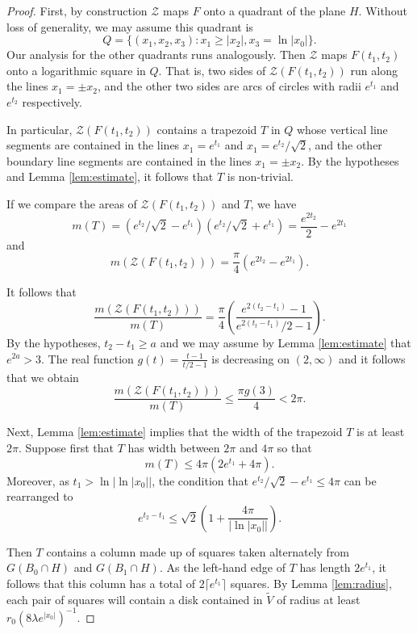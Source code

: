 \documentclass[11pt]{amsart}
\numberwithin{equation}{section}
\theoremstyle{definition}
\theoremstyle{definition}
\theoremstyle{definition}
\begin{document}
\begin{proof}
First, by construction $\mathcal{Z}$ maps $F$ onto a quadrant of the plane $H$. Without loss of generality, we may assume this quadrant is
\[ Q = \{ (x_1,x_2,x_3) : x_1 \geq |x_2|, x_3 = \ln |x_0| \}.\]
Our analysis for the other quadrants runs analogously. Then $\mathcal{Z}$ maps $F(t_1,t_2)$ onto a logarithmic square in $Q$. That is, two sides of $\mathcal{Z} ( F(t_1,t_2))$ run along the lines $x_1 = \pm x_2$, and the other two sides are arcs of circles with radii $e^{t_1}$ and $e^{t_2}$ respectively.

In particular, $\mathcal{Z} ( F(t_1,t_2))$ contains a trapezoid $T$ in $Q$ whose vertical line segments are contained in the lines $x_1 = e^{t_1}$ and $x_1 = e^{t_2}/\sqrt{2}$, and the other boundary line segments are contained in the lines $x_1 = \pm x_2$. By the hypotheses and Lemma \ref{lem:estimate}, it follows that $T$ is non-trivial. 

If we compare the areas of $\mathcal{Z} ( F(t_1,t_2))$ and $T$, we have
\[ m(T) = (e^{t_2}/\sqrt{2} - e^{t_1})(e^{t_2}/\sqrt{2} + e^{t_1}) = \frac{e^{2t_2}}{2} - e^{2t_1} \]
and
\[ m(\mathcal{Z} ( F(t_1,t_2))) = \frac{\pi}{4} (  e^{2t_2} - e^{2t_1}) .\]

It follows that
\[ \frac{  m(\mathcal{Z}( F(t_1,t_2) ) )}{m(T)} = \frac{\pi}{4} \left ( \frac{e^{2(t_2-t_1)} -1}{e^{2(t_t-t_1)}/2 -1} \right ). \]
By the hypotheses, $t_2-t_1\geq a$ and we may assume by Lemma \ref{lem:estimate} that $e^{2a}>3$. The real function $g(t) = \frac{t-1}{t/2-1}$ is decreasing on $(2,\infty)$ and it follows that we obtain
\begin{equation}
    \label{eq:double1}
\frac{  m(\mathcal{Z}( F(t_1,t_2) ) )}{m(T)} \leq \frac{\pi g(3)}{4} < 2\pi.
\end{equation}

Next, Lemma \ref{lem:estimate} implies that the width of the trapezoid $T$ is at least $2\pi$.
Suppose first that $T$ has width between $2\pi$ and $4\pi$ so that 
\begin{equation}
    \label{eq:Tsize}
    m(T) \leq 4\pi(2e^{t_1} + 4\pi).
\end{equation} 
Moreover, as $t_1>\ln | \ln|x_0||$, the condition that $e^{t_2}/\sqrt{2} - e^{t_1} \leq 4\pi$ can be rearranged to
\begin{equation}
    \label{eq:double2}
e^{t_2-t_1} \leq \sqrt{2}\left( 1+\frac{4\pi}{|\ln |x_0||}\right ).
\end{equation}

Then $T$ contains a column made up of squares taken alternately from $G(B_0 \cap H)$ and $G(B_1 \cap H)$. As the left-hand edge of $T$ has length $2e^{t_1}$, it follows that this column has a total of $2\lceil e^{t_1} \rceil$ squares. By Lemma \ref{lem:radius}, each pair of squares will contain a disk contained in $\widetilde{V}$ of radius at least $r_0(8\lambda e^{|x_0|})^{-1}$.


\end{proof}
\end{document}
